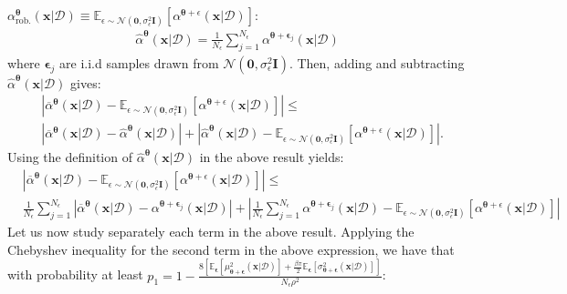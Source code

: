 \documentclass[jair,twoside,11pt,theapa]{article}
\theoremstyle{definition}
\begin{document}
$\alpha^{\bm{\theta}}_{\text{rob.}}(\bm{x}|\mathcal{D}) \equiv \mathbb{E}_{\epsilon \sim \mathcal{N}(\bm{0}, \sigma_{\epsilon}^{2}\bm{I})}\left[\alpha^{\bm{\theta}+\epsilon}(\bm{x}|\mathcal{D})\right]$:
\begin{align*}
    \hat{\alpha}^{\bm{\theta}}(\bm{x}|\mathcal{D}) = \frac{1}{N_{\epsilon}}\sum_{j=1}^{N_{\epsilon}}\alpha^{\bm{\theta}+ \bm{\epsilon}_j}(\bm{x}|\mathcal{D}) 
\end{align*}
where $\bm{\epsilon}_j $ are i.i.d samples drawn from $ \mathcal{N}(\bm{0},\sigma^2_{\epsilon}\bm{I})$. Then, adding and subtracting $\hat{\alpha}^{\bm{\theta}}(\bm{x}|\mathcal{D})$ gives:
\begin{align*}
    &\left|\overline{\alpha}^{\bm{\theta}} (\bm{x}|\mathcal{D}) - \mathbb{E}_{\epsilon \sim \mathcal{N}(\bm{0}, \sigma_{\epsilon}^{2}\bm{I})}\left[\alpha^{\bm{\theta}+\epsilon}(\bm{x}|\mathcal{D})\right]\right| \le \\\nonumber
    &\left|\overline{\alpha}^{\bm{\theta}} (\bm{x}|\mathcal{D}) - \hat{\alpha}^{\bm{\theta}}(\bm{x}|\mathcal{D})\right| + \nonumber
    \left| \hat{\alpha}^{\bm{\theta}}(\bm{x}|\mathcal{D}) - \mathbb{E}_{\epsilon \sim \mathcal{N}(\bm{0}, \sigma_{\epsilon}^{2}\bm{I})}\left[\alpha^{\bm{\theta}+\epsilon}(\bm{x}|\mathcal{D})\right]\right|.
\end{align*}
Using the definition of $\hat{\alpha}^{\bm{\theta}}(\bm{x}|\mathcal{D})$ in the above result yields:
\begin{align}\label{Eq:result_one_overall}
    &\left|\overline{\alpha}^{\bm{\theta}} (\bm{x}|\mathcal{D}) - \mathbb{E}_{\epsilon \sim \mathcal{N}(\bm{0}, \sigma_{\epsilon}^{2}\bm{I})}\left[\alpha^{\bm{\theta}+\epsilon}(\bm{x}|\mathcal{D})\right]\right| \le \\\nonumber
    &\frac{1}{N_{\epsilon}}\sum_{j=1}^{N_{\epsilon}}\left|\overline{\alpha}^{\bm{\theta}} (\bm{x}|\mathcal{D}) - \alpha^{\bm{\theta}+\bm{\epsilon}_j}(\bm{x}|\mathcal{D})\right| + \nonumber
    \left|\frac{1}{N_{\epsilon}}\sum_{j=1}^{N_{\epsilon}}\alpha^{\bm{\theta}+\bm{\epsilon}_j}(\bm{x}|\mathcal{D}) -  \mathbb{E}_{\epsilon \sim \mathcal{N}(\bm{0}, \sigma_{\epsilon}^{2}\bm{I})}\left[\alpha^{\bm{\theta}+\epsilon}(\bm{x}|\mathcal{D})\right]\right|
\end{align}
Let us now study separately each term in the above result. Applying the Chebyshev inequality for the second term in the above expression, we have that with probability at least $p_1 = 1 - \frac{8\left[\mathbb{E}_{\bm{\epsilon}}\left[\mu^2_{\bm{\theta} + \bm{\epsilon}}(\bm{x}|\mathcal{D})\right] + \frac{\beta\pi}{2}\mathbb{E}_{\bm{\epsilon}}\left[\sigma^2_{\bm{\theta} + \bm{\epsilon}}(\bm{x}|\mathcal{D})\right]\right]}{N_{\epsilon}\rho^2}$:
\end{document}
